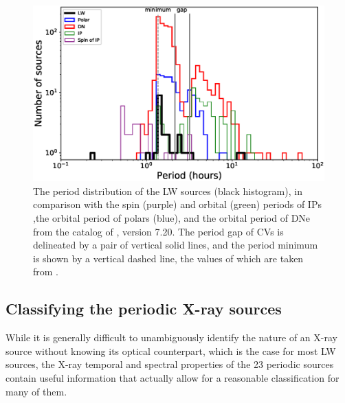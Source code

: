 \documentclass[fleqn,usenatbib]{mnras}
\begin{document}
\begin{figure}
\centering
\includegraphics[scale=0.73]{./figure/CV/N_P.eps}
\caption{The period distribution of the LW sources (black histogram), in comparison with the spin (purple) and orbital (green) periods of IPs ,the orbital period of polars (blue), and the orbital period of DNe from the catalog of \citet{2003A&A...404..301R}, version 7.20. The period gap of CVs is delineated by a pair of vertical solid lines, and the period minimum is shown by a vertical dashed line, the values of which are taken from \citet{2011ApJS..194...28K}.\label{fig:N_P}}
\end{figure}

\subsection{Classifying the periodic X-ray sources}
\label{subsec:class}
While it is generally difficult to unambiguously identify the nature of an X-ray source without knowing its optical counterpart, which is the case for most LW sources, the X-ray temporal and spectral properties of the 23 periodic sources contain useful information that actually allow for a reasonable classification for many of them. 
\end{document}

